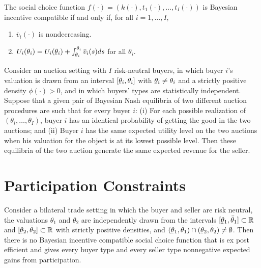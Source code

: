 \begin{prop}
    The social choice function $f(\cdot) = (k(\cdot), t_1(\cdot), \dots, t_I(\cdot))$ is Bayesian incentive compatible if and only if, for all $i = 1, \dots, I$,
    \begin{enumerate}
        \item $\bar{v}_i (\cdot)$ is nondecreasing.
        \item $U_i(\theta_i) = U_i(\ubar{\theta}_i) + \int_{\ubar{\theta}_i}^{\theta_i} \bar{v}_i (s) ds$ for all $\theta_i$.
    \end{enumerate}
\end{prop}

\begin{prop}
    Consider an auction setting with $I$ risk-neutral buyers, in which buyer $i$'s valuation is drawn from an interval $[\ubar{\theta}_i, \theta_i]$ with $\ubar{\theta}_i \neq \theta_i$ and a strictly positive density $\phi(\cdot) > 0$, and in which buyers' types are statistically independent. Suppose that a given pair of Bayesian Nash equilibria of two different auction procedures are such that for every buyer $i$: (i) For each possible realization of $(\theta_i, \dots, \theta_I)$, buyer $i$ has an identical probability of getting the good in the two auctions; and (ii) Buyer $i$ has the same expected utility level on the two auctions when his valuation for the object is at its lowest possible level. Then these equilibria of the two auction generate the same expected revenue for the seller.
\end{prop}


\section{Participation Constraints}

\begin{prop}
    Consider a bilateral trade setting in which the buyer and seller are risk neutral, the valuations $\theta_1$ and $\theta_2$ are independently drawn from the intervals $[\ubar{\theta}_1, \bar{\theta}_1] \subset \mathbb{R}$ and $[\ubar{\theta}_2, \bar{\theta}_2] \subset \mathbb{R}$ with strictly positive densities, and $(\ubar{\theta}_1, \bar{\theta}_1) \cap (\ubar{\theta}_2, \bar{\theta}_2) \neq \emptyset$. Then there is no Bayesian incentive compatible social choice function that is ex post efficient and gives every buyer type and every seller type nonnegative expected gains from participation.
\end{prop}


